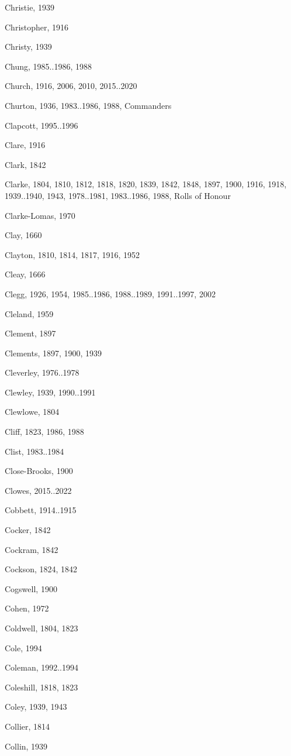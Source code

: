 {\begin{theindex}
\item Christie, 1939
\item Christopher, 1916
\item Christy, 1939
\item Chung, 1985..1986, 1988
\item Church, 1916, 2006, 2010, 2015..2020
\item Churton, 1936, 1983..1986, 1988, Commanders
\item Clapcott, 1995..1996
\item Clare, 1916
\item Clark, 1842
\item Clarke, 1804, 1810, 1812, 1818, 1820, 1839, 1842, 1848, 1897, 1900, 1916, 1918, 1939..1940, 1943, 1978..1981, 1983..1986, 1988, Rolls of Honour
\item Clarke-Lomas, 1970
\item Clay, 1660
\item Clayton, 1810, 1814, 1817, 1916, 1952
\item Cleay, 1666
\item Clegg, 1926, 1954, 1985..1986, 1988..1989, 1991..1997, 2002
\item Cleland, 1959
\item Clement, 1897
\item Clements, 1897, 1900, 1939
\item Cleverley, 1976..1978
\item Clewley, 1939, 1990..1991
\item Clewlowe, 1804
\item Cliff, 1823, 1986, 1988
\item Clist, 1983..1984
\item Close-Brooks, 1900
\item Clowes, 2015..2022
\item Cobbett, 1914..1915
\item Cocker, 1842
\item Cockram, 1842
\item Cockson, 1824, 1842
\item Cogswell, 1900
\item Cohen, 1972
\item Coldwell, 1804, 1823
\item Cole, 1994
\item Coleman, 1992..1994
\item Coleshill, 1818, 1823
\item Coley, 1939, 1943
\item Collier, 1814
\item Collin, 1939

\end{theindex}}
